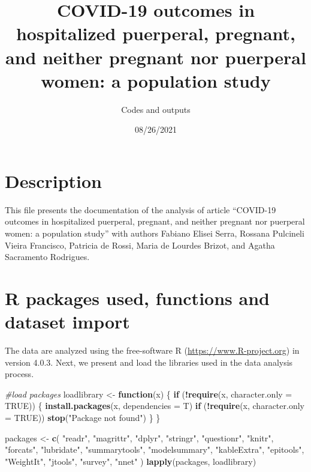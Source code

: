 \documentclass[
]{article}
\title{COVID-19 outcomes in hospitalized puerperal, pregnant, and neither
pregnant nor puerperal women: a population study}
\author{Codes and outputs}
\date{08/26/2021}
\newenvironment{Shaded}{\begin{snugshade}}{\end{snugshade}}
\newcommand{\CommentTok}[1]{\textcolor[rgb]{0.56,0.35,0.01}{\textit{#1}}}
\newcommand{\ControlFlowTok}[1]{\textcolor[rgb]{0.13,0.29,0.53}{\textbf{#1}}}
\newcommand{\DataTypeTok}[1]{\textcolor[rgb]{0.13,0.29,0.53}{#1}}
\newcommand{\KeywordTok}[1]{\textcolor[rgb]{0.13,0.29,0.53}{\textbf{#1}}}
\newcommand{\NormalTok}[1]{#1}
\newcommand{\OperatorTok}[1]{\textcolor[rgb]{0.81,0.36,0.00}{\textbf{#1}}}
\newcommand{\OtherTok}[1]{\textcolor[rgb]{0.56,0.35,0.01}{#1}}
\newcommand{\StringTok}[1]{\textcolor[rgb]{0.31,0.60,0.02}{#1}}
\begin{document}
\maketitle

\hypertarget{description}{%
\section{Description}\label{description}}

This file presents the documentation of the analysis of article
``COVID-19 outcomes in hospitalized puerperal, pregnant, and neither
pregnant nor puerperal women: a population study'' with authors Fabiano
Elisei Serra, Rossana Pulcineli Vieira Francisco, Patricia de Rossi,
Maria de Lourdes Brizot, and Agatha Sacramento Rodrigues.

\hypertarget{r-packages-used-functions-and-dataset-import}{%
\section{R packages used, functions and dataset
import}\label{r-packages-used-functions-and-dataset-import}}

The data are analyzed using the free-software R
(\url{https://www.R-project.org}) in version 4.0.3. Next, we present and
load the libraries used in the data analysis process.

\begin{Shaded}
\begin{Highlighting}[]
\CommentTok{#load packages}
\NormalTok{loadlibrary <-}\StringTok{ }\ControlFlowTok{function}\NormalTok{(x) \{}
  \ControlFlowTok{if}\NormalTok{ (}\OperatorTok{!}\KeywordTok{require}\NormalTok{(x, }\DataTypeTok{character.only =} \OtherTok{TRUE}\NormalTok{)) \{}
    \KeywordTok{install.packages}\NormalTok{(x, }\DataTypeTok{dependencies =}\NormalTok{ T)}
    \ControlFlowTok{if}\NormalTok{ (}\OperatorTok{!}\KeywordTok{require}\NormalTok{(x, }\DataTypeTok{character.only =} \OtherTok{TRUE}\NormalTok{))}
      \KeywordTok{stop}\NormalTok{(}\StringTok{"Package not found"}\NormalTok{)}
\NormalTok{  \}}
\NormalTok{\}}

\NormalTok{packages <-}
\StringTok{  }\KeywordTok{c}\NormalTok{(}
    \StringTok{"readr"}\NormalTok{,}
    \StringTok{"magrittr"}\NormalTok{,}
    \StringTok{"dplyr"}\NormalTok{,}
    \StringTok{"stringr"}\NormalTok{,}
    \StringTok{"questionr"}\NormalTok{,}
    \StringTok{"knitr"}\NormalTok{,}
    \StringTok{"forcats"}\NormalTok{,}
    \StringTok{"lubridate"}\NormalTok{,}
    \StringTok{"summarytools"}\NormalTok{,}
    \StringTok{"modelsummary"}\NormalTok{,}
    \StringTok{"kableExtra"}\NormalTok{,}
    \StringTok{"epitools"}\NormalTok{,}
    \StringTok{"WeightIt"}\NormalTok{,}
    \StringTok{"jtools"}\NormalTok{,}
    \StringTok{"survey"}\NormalTok{,}
    \StringTok{"nnet"}
\NormalTok{  )}
\KeywordTok{lapply}\NormalTok{(packages, loadlibrary)}
\end{Highlighting}
\end{Shaded}
\end{document}
